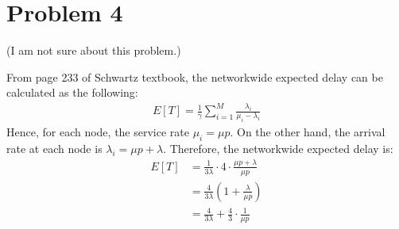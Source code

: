\documentclass{article}
\begin{document}
\section*{Problem 4}
	(I am not sure about this problem.)

	From page 233 of Schwartz textbook, the networkwide expected delay can be
	calculated as the following:
	\begin{align*}
		E[T] = \frac{1}{\gamma} \sum\limits_{i=1}^{M} \frac{\lambda_{i}}{\mu_{i} - \lambda_{i}}
	\end{align*}
	Hence, for each node, the service rate $\mu_{i} = \mu p$. On the other
	hand, the arrival rate at each node is $\lambda_{i} = \mu p + \lambda$.
	Therefore, the networkwide expected delay is:
	\begin{align*}
		E[T] &= \frac{1}{3\lambda} \cdot 4 \cdot \frac{\mu p + \lambda}{\mu p} \\
		&= \frac{4}{3\lambda} \left( 1 + \frac{\lambda}{\mu p} \right) \\
		&= \frac{4}{3\lambda} + \frac{4}{3} \cdot \frac{1}{\mu p}
	\end{align*}
\end{document}
